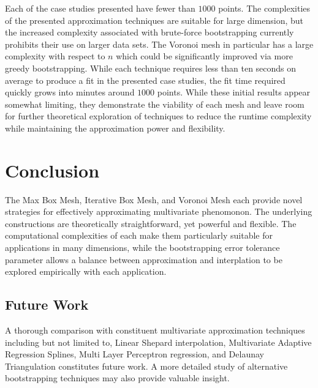 Each of the case studies presented have fewer than $1000$ points. The complexities of the presented approximation techniques are suitable for large dimension, but the increased complexity associated with brute-force bootstrapping currently prohibits their use on larger data sets. The Voronoi mesh in particular has a large complexity with respect to $n$ which could be significantly improved via more greedy bootstrapping. While each technique requires less than ten seconds on average to produce a fit in the presented case studies, the fit time required quickly grows into minutes around $1000$ points. While these initial results appear somewhat limiting, they demonstrate the viability of each mesh and leave room for further theoretical exploration of techniques to reduce the runtime complexity while maintaining the approximation power and flexibility.

\section{Conclusion}

The Max Box Mesh, Iterative Box Mesh, and Voronoi Mesh each provide novel strategies for effectively approximating multivariate phenomonon. The underlying constructions are theoretically straightforward, yet powerful and flexible. The computational complexities of each make them particularly suitable for applications in many dimensions, while the bootstrapping error tolerance parameter allows a balance between approximation and interplation to be explored empirically with each application.

\subsection{Future Work}

A thorough comparison with constituent multivariate approximation techniques including but not limited to, Linear Shepard interpolation, Multivariate Adaptive Regression Splines, Multi Layer Perceptron regression, and Delaunay Triangulation constitutes future work. A more detailed study of alternative bootstrapping techniques may also provide valuable insight.
